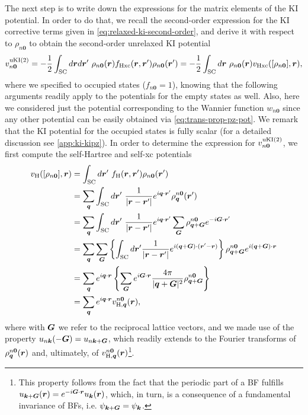 The next step is to write down the expressions for the matrix elements of the KI potential. In order to do that, we recall the second-order expression for the KI corrective terms given in \cref{eq:relaxed-ki-second-order}, and derive it with respect to $\rho_{n{\bm 0}}$ to obtain the second-order unrelaxed KI potential
%
\begin{equation}
    v^{\rm uKI(2)}_{n{\bm 0}} = - \frac{1}{2} \int_{\rm SC} d{\bm r} d{\bm r}' \ \rho_{n{\bm 0}}({\bm r}) f_{\rm Hxc}({\bm r},{\bm r}') \rho_{n{\bm 0}}({\bm r}') =
    - \frac{1}{2} \int_{\rm SC} d{\bm r} \ \rho_{n{\bm 0}}({\bm r}) v_{\rm Hxc}([\rho_{n{\bm 0}}],{\bm r}) ,
    \label{eq:ki-pot-second-order}
\end{equation}
%
where we specified to occupied states ($f_{n{\bm 0}} = 1$), knowing that the following arguments readily apply to the potentials for the empty states as well. Also, here we considered just the potential corresponding to the Wannier function $w_{n{\bm 0}}$ since any other potential can be easily obtained via \cref{eq:trans-prop-pz-pot}. We remark that the KI potential for the occupied states is fully scalar (for a detailed discussion see \cref{app:ki-kipz}). In order to determine the expression for $v^{\rm uKI(2)}_{n{\bm 0}}$, we first compute the self-Hartree and self-xc potentials
%
\begin{equation}
    \begin{split}
        v_{\rm H}([\rho_{n{\bm 0}}],{\bm r}) &= \int_{\rm SC} d{\bm r}' \ f_{\rm H}({\bm r},{\bm r}') \rho_{n{\bm 0}}({\bm r}') \\
        &= \sum_{{\bm q}} \int_{\rm SC} d{\bm r}' \ \frac{1}{|{\bm r} - {\bm r}'|} e^{i {\bm q} \cdot {\bm r}'} \rho_{{\bm q}}^{n{\bm 0}}({\bm r}') \\
        &= \sum_{{\bm q}} \int_{\rm SC} d{\bm r}' \ \frac{1}{|{\bm r} - {\bm r}'|} e^{i {\bm q} \cdot {\bm r}'} \sum_{{\bm G}} \rho_{{\bm q}+{\bm G}}^{n {\bm 0}} e^{-i {\bm G} \cdot {\bm r}'} \\
        &= \sum_{{\bm q}} \sum_{{\bm G}} \left\{ \int_{\rm SC} d{\bm r}' \frac{1}{|{\bm r} -{\bm r}'|} e^{i({\bm q}+{\bm G}) \cdot ({\bm r}'-{\bm r})} \right\} \rho_{{\bm q}+{\bm G}}^{n {\bm 0}} e^{i({\bm q}+{\bm G}) \cdot {\bm r}} \\
        &= \sum_{{\bm q}} e^{i {\bm q} \cdot {\bm r}} \left\{ \sum_{{\bm G}} e^{i {\bm G} \cdot {\bm r}} \frac{4\pi}{|{\bm q}+{\bm G}|^2} \rho_{{\bm q}+{\bm G}}^{n {\bm 0}} \right\} \\
        &= \sum_{{\bm q}} e^{i {\bm q} \cdot {\bm r}} v_{{\rm H},{\bm q}}^{n{\bm 0}}({\bm r}) ,
    \end{split}
    \label{eq:self-hartree-kcw}
\end{equation}
%
where with ${\bm G}$ we refer to the reciprocal lattice vectors, and we made use of the property $u_{n{\bm k}}(-{\bm G}) = u_{n{\bm k}+{\bm G}}$, which readily extends to the Fourier transforms of $\rho_{{\bm q}}^{n{\bm 0}}({\bm r})$ and, ultimately, of $v_{{\rm H},{\bm q}}^{n{\bm 0}}({\bm r})$\footnote{
This property follows from the fact that the periodic part of a BF fulfills $u_{{\bm k}+{\bm G}}({\bm r}) = e^{-i {\bm G} \cdot {\bm r}} u_{{\bm k}}({\bm r})$, which, in turn, is a consequence of a fundamental invariance of BFs, i.e. $\psi_{{\bm k}+{\bm G}} = \psi_{{\bm k}}$.
}. 
